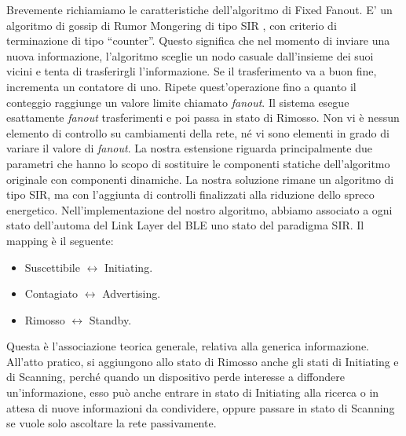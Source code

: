 Brevemente richiamiamo le caratteristiche dell'algoritmo di Fixed Fanout. E' un algoritmo di gossip di Rumor Mongering di tipo \acf{SIR} , con criterio di terminazione di tipo “counter”. Questo significa che nel momento di inviare una nuova informazione, l'algoritmo sceglie un nodo casuale dall'insieme dei suoi vicini e tenta di trasferirgli l'informazione. Se il trasferimento va a buon fine, incrementa un contatore di uno. Ripete quest'operazione fino a quanto il conteggio raggiunge un valore limite chiamato \textit{fanout}. Il sistema esegue esattamente \textit{fanout} trasferimenti e poi passa in stato di Rimosso. Non vi è nessun elemento di controllo su cambiamenti della rete, né vi sono elementi in grado di variare il valore di \textit{fanout}. La nostra estensione riguarda principalmente due parametri che hanno lo scopo di sostituire le componenti statiche dell'algoritmo originale con componenti dinamiche. La nostra soluzione rimane un algoritmo di tipo \acs{SIR}, ma con l'aggiunta di controlli finalizzati alla riduzione dello spreco energetico. Nell'implementazione del nostro algoritmo, abbiamo associato a ogni stato dell'automa del Link Layer del \acs{BLE} uno stato del paradigma SIR. Il mapping è il seguente:
\begin{itemize}
	\item Suscettibile $ \longleftrightarrow $ Initiating.
	\item Contagiato $ \longleftrightarrow $ Advertising.
	\item Rimosso $ \longleftrightarrow $ Standby.
\end{itemize}
Questa è l'associazione teorica generale, relativa alla generica informazione. All'atto pratico, si aggiungono allo stato di Rimosso anche gli stati di Initiating e di Scanning, perché quando un dispositivo perde interesse a diffondere un'informazione, esso può anche entrare in stato di Initiating alla ricerca o in attesa di nuove informazioni da condividere, oppure passare in stato di Scanning se vuole solo ascoltare la rete passivamente.

